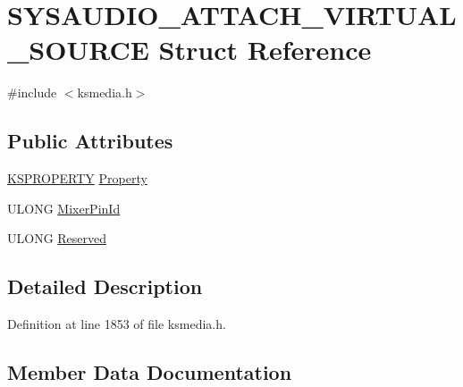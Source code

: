 \hypertarget{struct_s_y_s_a_u_d_i_o___a_t_t_a_c_h___v_i_r_t_u_a_l___s_o_u_r_c_e}{}\section{S\+Y\+S\+A\+U\+D\+I\+O\+\_\+\+A\+T\+T\+A\+C\+H\+\_\+\+V\+I\+R\+T\+U\+A\+L\+\_\+\+S\+O\+U\+R\+CE Struct Reference}
\label{struct_s_y_s_a_u_d_i_o___a_t_t_a_c_h___v_i_r_t_u_a_l___s_o_u_r_c_e}


{\ttfamily \#include $<$ksmedia.\+h$>$}

\subsection*{Public Attributes}
\begin{DoxyCompactItemize}
\item 
\hyperlink{ks_8h_a4392f77c74e868d813d46c39ada4d660}{K\+S\+P\+R\+O\+P\+E\+R\+TY} \hyperlink{struct_s_y_s_a_u_d_i_o___a_t_t_a_c_h___v_i_r_t_u_a_l___s_o_u_r_c_e_a161abfc8f852af152aca289dd4c1099c}{Property}
\item 
U\+L\+O\+NG \hyperlink{struct_s_y_s_a_u_d_i_o___a_t_t_a_c_h___v_i_r_t_u_a_l___s_o_u_r_c_e_aac6723eb12556b30e5f7f63ba3f58c91}{Mixer\+Pin\+Id}
\item 
U\+L\+O\+NG \hyperlink{struct_s_y_s_a_u_d_i_o___a_t_t_a_c_h___v_i_r_t_u_a_l___s_o_u_r_c_e_a454d1306c16a04d1d4c98da51b3bc9d0}{Reserved}
\end{DoxyCompactItemize}


\subsection{Detailed Description}


Definition at line 1853 of file ksmedia.\+h.



\subsection{Member Data Documentation}
